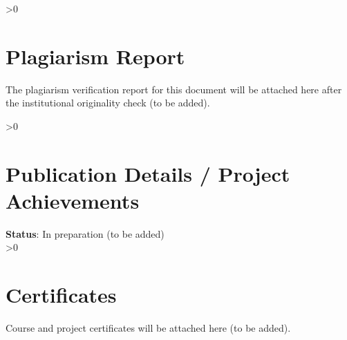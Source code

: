 \documentclass[12pt,a4paper]{report}
\let\oldchapter\chapter
\renewcommand{\chapter}{\ifnum\value{chapter}>0 \clearpage\pagestyle{fancy}\fi\oldchapter}
\begin{document}
\chapter*{Plagiarism Report}
The plagiarism verification report for this document will be attached
here after the institutional originality check (to be added).

\chapter*{Publication Details / Project Achievements}
\textbf{Status}: In preparation (to be added) \\

\chapter*{Certificates}

Course and project certificates will be attached here (to be added).
\end{document}
